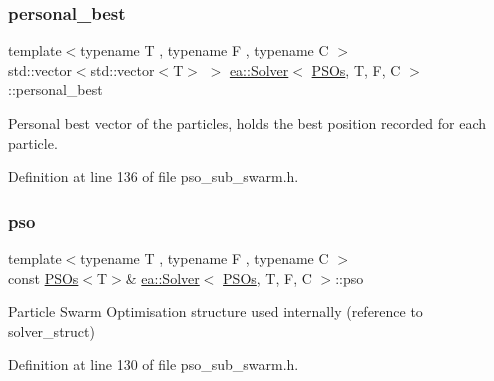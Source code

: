 \subsubsection{\texorpdfstring{personal\+\_\+best}{personal\_best}}
{\footnotesize\ttfamily template$<$typename T , typename F , typename C $>$ \\
std\+::vector$<$std\+::vector$<$T$>$ $>$ \hyperlink{classea_1_1_solver}{ea\+::\+Solver}$<$ \hyperlink{structea_1_1_p_s_os}{P\+S\+Os}, T, F, C $>$\+::personal\+\_\+best\hspace{0.3cm}{\ttfamily [private]}}



Personal best vector of the particles, holds the best position recorded for each particle. 



Definition at line 136 of file pso\+\_\+sub\+\_\+swarm.\+h.

\mbox{\label{classea_1_1_solver_3_01_p_s_os_00_01_t_00_01_f_00_01_c_01_4_a1f1aa62756a73565ebe0ca1fbc084ea5}} 
\subsubsection{\texorpdfstring{pso}{pso}}
{\footnotesize\ttfamily template$<$typename T , typename F , typename C $>$ \\
const \hyperlink{structea_1_1_p_s_os}{P\+S\+Os}$<$T$>$\& \hyperlink{classea_1_1_solver}{ea\+::\+Solver}$<$ \hyperlink{structea_1_1_p_s_os}{P\+S\+Os}, T, F, C $>$\+::pso\hspace{0.3cm}{\ttfamily [private]}}



Particle Swarm Optimisation structure used internally (reference to solver\+\_\+struct) 



Definition at line 130 of file pso\+\_\+sub\+\_\+swarm.\+h.

\mbox{\label{classea_1_1_solver_3_01_p_s_os_00_01_t_00_01_f_00_01_c_01_4_ac188af95a817ad70538969bd5af2dc66}} 

